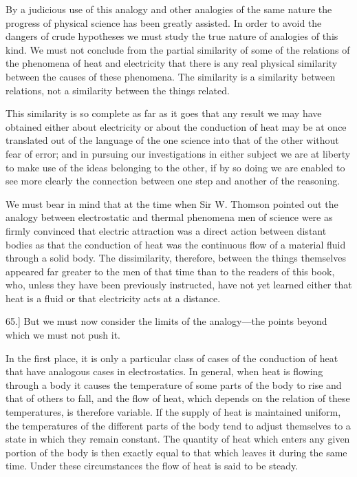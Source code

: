 \documentclass[12pt,oneside]{book}[2021/10/04]
\newcommand{\Runhead}[1]{\fancyhead[C]{\iffloatpage{}{\small#1}}}
\newcommand{\article}[1]{\phantomsection \label{art:#1}{#1.]}}
\newcommand{\¬}{\hphantom{0}}
\begin{document}
By a judicious use of this analogy and other analogies of the
same nature the progress of physical science has been greatly assisted.
In order to avoid the dangers of crude hypotheses we must
study the true nature of analogies of this kind. We must not conclude
from the partial similarity of some of the relations of the
phenomena of heat and electricity that there is any real physical
similarity between the causes of these phenomena. The similarity
is a similarity between relations, not a similarity between the things
related.

This similarity is so complete as far as it goes that any result we
may have obtained either about electricity or about the conduction
of heat may be at once translated out of the language of the one
science into that of the other without fear of error; and in pursuing
our investigations in either subject we are at liberty to make use
of the ideas belonging to the other, if by so doing we are enabled
to see more clearly the connection between one step and another of
the reasoning.

We must bear in mind that at the time when Sir W. Thomson
pointed out the analogy between electrostatic and thermal phenomena
men of science were as firmly convinced that electric attraction
was a direct action between distant bodies as that the
conduction of heat was the continuous flow of a material fluid
through a solid body. The dissimilarity, therefore, between the
things themselves appeared far greater to the men of that time than
to the readers of this book, who, unless they have been previously
instructed, have not yet learned either that heat is a fluid or that
electricity acts at a distance.

\article{65} But we must now consider the limits of the analogy---the
points beyond which we must not push it.
\Runhead{LIMITATION TO THE USE OF ANALOGIES.}

In the first place, it is only a particular class of cases of the
conduction of heat that have analogous cases in electrostatics. In
general, when heat is flowing through a body it causes the temperature
of some parts of the body to rise and that of others to fall,
and the flow of heat, which depends on the relation of these temperatures,
is therefore variable. If the supply of heat is maintained
uniform, the temperatures of the different parts of the body tend to
adjust themselves to a state in which they remain constant. The
quantity of heat which enters any given portion of the body is then
exactly equal to that which leaves it during the same time. Under
these circumstances the flow of heat is said to be steady.
\end{document}
